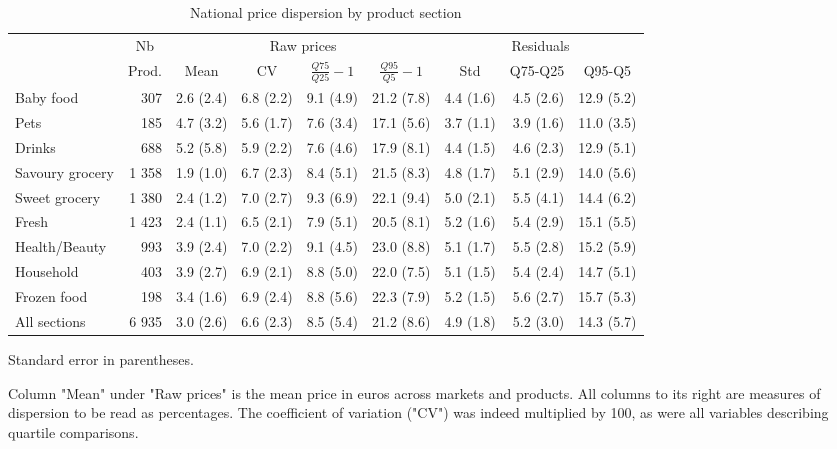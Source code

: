 \documentclass[english]{article}
\begin{document}
\begin{table}
\begin{threeparttable}
\caption{National price dispersion by product section}
\label{tab:stats_nat_dispersion}
\small
\begin{tabular}{lr|rrrr|rrr}
    \toprule
    \toprule
          & \multicolumn{1}{c|}{Nb} & \multicolumn{4}{c|}{Raw prices} & \multicolumn{3}{c}{Residuals} \\
          & \multicolumn{1}{c|}{Prod.} & \multicolumn{1}{c}{Mean} & \multicolumn{1}{c}{CV} & \multicolumn{1}{c}{$\frac{Q75}{Q25}-1$} & \multicolumn{1}{c|}{$\frac{Q95}{Q5}-1$} & \multicolumn{1}{c}{Std} & \multicolumn{1}{c}{Q75-Q25} & \multicolumn{1}{c}{Q95-Q5} \\
    \midrule
    Baby food &  307  & 2.6 (2.4) & 6.8 (2.2) & 9.1 (4.9) & 21.2 (7.8) & 4.4 (1.6) & 4.5 (2.6) & 12.9 (5.2) \\
    Pets  &  185  & 4.7 (3.2) & 5.6 (1.7) & 7.6 (3.4) & 17.1 (5.6) & 3.7 (1.1) & 3.9 (1.6) & 11.0 (3.5) \\
    Drinks &  688  & 5.2 (5.8) & 5.9 (2.2) & 7.6 (4.6) & 17.9 (8.1) & 4.4 (1.5) & 4.6 (2.3) & 12.9 (5.1) \\
    Savoury grocery & 1 358 & 1.9 (1.0) & 6.7 (2.3) & 8.4 (5.1) & 21.5 (8.3) & 4.8 (1.7) & 5.1 (2.9) & 14.0 (5.6) \\
    Sweet grocery & 1 380 & 2.4 (1.2) & 7.0 (2.7) & 9.3 (6.9) & 22.1 (9.4) & 5.0 (2.1) & 5.5 (4.1) & 14.4 (6.2) \\
    Fresh & 1 423 & 2.4 (1.1) & 6.5 (2.1) & 7.9 (5.1) & 20.5 (8.1) & 5.2 (1.6) & 5.4 (2.9) & 15.1 (5.5) \\
    Health/Beauty &  993  & 3.9 (2.4) & 7.0 (2.2) & 9.1 (4.5) & 23.0 (8.8) & 5.1 (1.7) & 5.5 (2.8) & 15.2 (5.9) \\
    Household &  403  & 3.9 (2.7) & 6.9 (2.1) & 8.8 (5.0) & 22.0 (7.5) & 5.1 (1.5) & 5.4 (2.4) & 14.7 (5.1) \\
    Frozen food &  198  & 3.4 (1.6) & 6.9 (2.4) & 8.8 (5.6) & 22.3 (7.9) & 5.2 (1.5) & 5.6 (2.7) & 15.7 (5.3) \\
    \midrule
    All sections & 6 935 & 3.0 (2.6) & 6.6 (2.3) & 8.5 (5.4) & 21.2 (8.6) & 4.9 (1.8) & 5.2 (3.0) & 14.3 (5.7) \\
    \bottomrule
    \bottomrule
\end{tabular}
\begin{tablenotes}
      \small
			\item Standard error in parentheses.
      \item Column "Mean" under "Raw prices" is the mean price in euros across markets and products. All columns to its right are measures of dispersion to be read as percentages. The coefficient of variation ("CV") was indeed multiplied by 100, as were all variables describing quartile comparisons.
\end{tablenotes}
\end{threeparttable}
\end{table}
\end{document}
